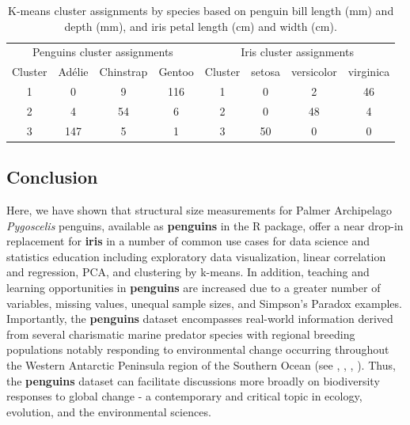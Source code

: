 \begin{Schunk}
\begin{table}

\caption{\label{tab:unnamed-chunk-5}K-means cluster assignments by species based on penguin bill length (mm) and depth (mm), and iris petal length (cm) and width (cm).}
\centering
\begin{tabular}[t]{cccccccc}
\toprule
\multicolumn{4}{c}{Penguins cluster assignments} & \multicolumn{4}{c}{Iris cluster assignments} \\
\cmidrule(l{3pt}r{3pt}){1-4} \cmidrule(l{3pt}r{3pt}){5-8}
Cluster & Adélie & Chinstrap & Gentoo & Cluster & setosa & versicolor & virginica\\
\midrule
1 & 0 & 9 & 116 & 1 & 0 & 2 & 46\\
2 & 4 & 54 & 6 & 2 & 0 & 48 & 4\\
3 & 147 & 5 & 1 & 3 & 50 & 0 & 0\\
\bottomrule
\end{tabular}
\end{table}

\end{Schunk}

\hypertarget{conclusion}{%
\subsection{Conclusion}\label{conclusion}}

Here, we have shown that structural size measurements for Palmer
Archipelago \emph{Pygoscelis} penguins, available as \textbf{penguins}
in the  R package, offer a near drop-in
replacement for \textbf{iris} in a number of common use cases for data
science and statistics education including exploratory data
visualization, linear correlation and regression, PCA, and clustering by
k-means. In addition, teaching and learning opportunities in
\textbf{penguins} are increased due to a greater number of variables,
missing values, unequal sample sizes, and Simpson's Paradox examples.
Importantly, the \textbf{penguins} dataset encompasses real-world
information derived from several charismatic marine predator species
with regional breeding populations notably responding to environmental
change occurring throughout the Western Antarctic Peninsula region of
the Southern Ocean (see \citet{bestelmeyer_analysis_2011},
\citet{gorman_ecological_2014}, \citet{gorman_population_2017},
\citet{gorman_advancing_2021}). Thus, the \textbf{penguins} dataset can
facilitate discussions more broadly on biodiversity responses to global
change - a contemporary and critical topic in ecology, evolution, and
the environmental sciences.

